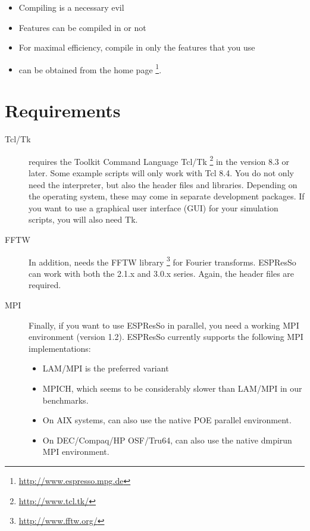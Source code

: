 
\begin{itemize}
\item Compiling \es{} is a necessary evil
\item Features can be compiled in or not
\item For maximal efficiency, compile in only the features that you
  use
\item \es{} can be obtained from the \es{} home page
  \footnote{\url{http://www.espresso.mpg.de}}.
\end{itemize}



\section{Requirements}
\label{sec:requirements}

\begin{description}
\item[Tcl/Tk] \es{} requires the Toolkit Command Language Tcl/Tk
  \footnote{\url{http://www.tcl.tk/}} in the version 8.3 or later.
  Some example scripts will only work with Tcl 8.4. You do not only
  need the interpreter, but also the header files and libraries.
  Depending on the operating system, these may come in separate
  development packages. If you want to use a graphical user interface
  (GUI) for your simulation scripts, you will also need Tk.
  
\item[FFTW] In addition, \es{} needs the FFTW library
  \footnote{\url{http://www.fftw.org/}} for Fourier transforms.
  ESPResSo can work with both the 2.1.x and 3.0.x series. Again, the
  header files are required.
  
\item[MPI] Finally, if you want to use ESPResSo in parallel, you need
  a working MPI environment (version 1.2). ESPResSo currently supports
  the following MPI implementations:
  \begin{itemize}
  \item LAM/MPI is the preferred variant
  \item MPICH, which seems to be considerably slower than LAM/MPI in
    our benchmarks.
  \item On AIX systems, \es{} can also use the native POE parallel
    environment.
  \item On DEC/Compaq/HP OSF/Tru64, \es{} can also use the native
    dmpirun MPI environment.
  \end{itemize}
\end{description}

